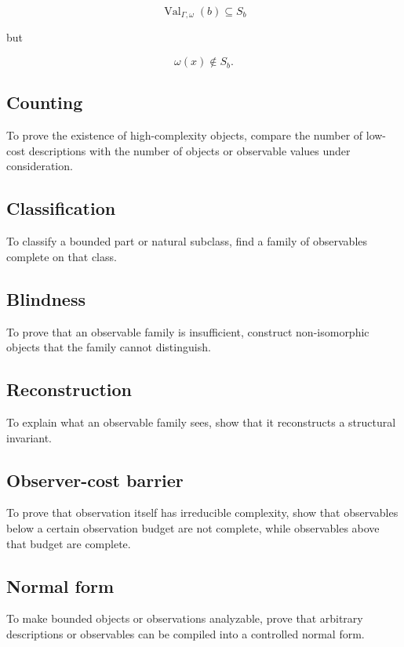 \documentclass[11pt]{article}
\begin{document}
\[
\operatorname{Val}_{\Gamma,\omega}(b)\subseteq S_b
\]

but

\[
\omega(x)\notin S_b.
\]


\subsection*{Counting}

To prove the existence of high-complexity objects, compare the number of low-cost descriptions with the number of objects or observable values under consideration.


\subsection*{Classification}

To classify a bounded part or natural subclass, find a family of observables complete on that class.


\subsection*{Blindness}

To prove that an observable family is insufficient, construct non-isomorphic objects that the family cannot distinguish.


\subsection*{Reconstruction}

To explain what an observable family sees, show that it reconstructs a structural invariant.


\subsection*{Observer-cost barrier}

To prove that observation itself has irreducible complexity, show that observables below a certain observation budget are not complete, while observables above that budget are complete.


\subsection*{Normal form}

To make bounded objects or observations analyzable, prove that arbitrary descriptions or observables can be compiled into a controlled normal form.
\end{document}
